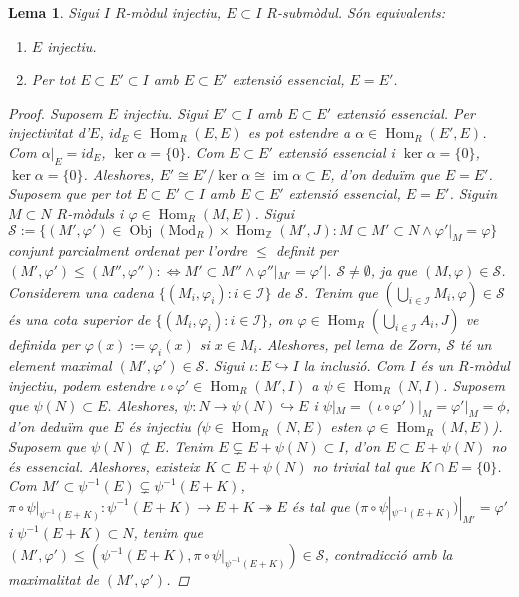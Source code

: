 \documentclass[compress]{article}
\newtheorem{lema}{Lema}
\theoremstyle{definition}
\DeclareMathOperator{\im}{im}
\DeclareMathOperator{\Hom}{Hom}
\DeclareMathOperator{\Obj}{Obj}
\begin{document}
        \begin{lema}
            Sigui $I$ $R$-mòdul injectiu, $E\subset I$ $R$-submòdul. Són equivalents:
            \begin{enumerate}
                \item $E$ injectiu.
                \item Per tot $E\subset E'\subset I$ amb $E\subset E'$ extensió essencial, $E=E'$.
            \end{enumerate}
            \begin{proof}
                Suposem $E$ injectiu. Sigui $E'\subset I$ amb $E\subset E'$ extensió essencial. Per injectivitat d'$E$, $id_{E}\in\Hom_{R}(E,E)$ es pot estendre a $\alpha\in\Hom_{R}(E',E)$. Com $\alpha|_{E}=id_{E}$, $\ker{\alpha}=\{0\}$. Com $E\subset E'$ extensió essencial i $\ker{\alpha}=\{0\}$, $\ker{\alpha}=\{0\}$. Aleshores, $E'\cong E'/\ker{\alpha}\cong\im{\alpha}\subset E$, d'on deduïm que $E=E'$.\newline
                Suposem que per tot $E\subset E'\subset I$ amb $E\subset E'$ extensió essencial, $E=E'$. Siguin $M\subset N$ $R$-mòduls i $\varphi\in\Hom_{R}(M,E)$. Sigui $\mathcal{S}:=\{(M',\varphi')\in\Obj(\textrm{Mod}_{R})\times\Hom_{\mathbb{Z}}(M',J):M\subset M'\subset N\land\varphi'|_{M}=\varphi\}$ conjunt parcialment ordenat per l'ordre $\leq$ definit per $(M',\varphi')\leq(M'',\varphi''):\iff M'\subset M''\land\varphi''|_{M'}=\varphi'|$. $\mathcal{S}\neq\emptyset$, ja que $(M,\varphi)\in\mathcal{S}$. Considerem una cadena $\{(M_{i},\varphi_{i}):i\in\mathscr{I}\}$ de $\mathcal{S}$. Tenim que $(\bigcup_{i\in\mathscr{I}}M_{i},\varphi)\in\mathcal{S}$ és una cota superior de $\{(M_{i},\varphi_{i}):i\in\mathscr{I}\}$, on $\varphi\in\Hom_{R}(\bigcup_{i\in\mathscr{I}}A_{i},J)$ ve definida per $\varphi(x):=\varphi_{i}(x)$ si $x\in M_{i}$. Aleshores, pel lema de Zorn, $\mathcal{S}$ té un element maximal $(M',\varphi')\in\mathcal{S}$.\newline
                Sigui $\iota:E\hookrightarrow I$ la inclusió. Com $I$ és un $R$-mòdul injectiu, podem estendre $\iota\circ\varphi'\in\Hom_{R}(M',I)$ a $\psi\in\Hom_{R}(N,I)$. Suposem que $\psi(N)\subset E$. Aleshores, $\psi:N\rightarrow\psi(N)\hookrightarrow E$ i $\psi|_{M}=(\iota\circ\varphi')|_{M}=\varphi'|_{M}=\phi$, d'on deduïm que $E$ és injectiu ($\psi\in\Hom_{R}(N,E)$ esten $\varphi\in\Hom_{R}(M,E)$). Suposem que $\psi(N)\not\subset E$. Tenim $E\subsetneq E+\psi(N)\subset I$, d'on $E\subset E+\psi(N)$ no és essencial. Aleshores, existeix $K\subset E+\psi(N)$ no trivial tal que $K\cap E=\{0\}$. Com $M'\subset\psi^{-1}(E)\subsetneq\psi^{-1}(E+K)$, $\pi\circ\psi|_{\psi^{-1}(E+K)}:\psi^{-1}(E+K)\rightarrow E+K\twoheadrightarrow E$ és tal que $(\pi\circ\psi|_{\psi^{-1}(E+K)})|_{M'}=\varphi'$ i $\psi^{-1}(E+K)\subset N$, tenim que $(M',\varphi')\leq(\psi^{-1}(E+K),\pi\circ\psi|_{\psi^{-1}(E+K)})\in\mathcal{S}$, contradicció amb la maximalitat de $(M',\varphi')$.
            \end{proof}
        \end{lema}
\end{document}
